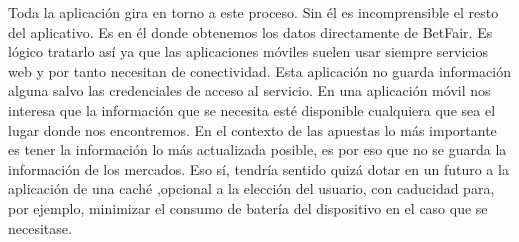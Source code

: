     
    Toda la aplicación gira en torno a este proceso. Sin él es incomprensible el resto del aplicativo. Es en él donde obtenemos los datos directamente de BetFair. Es lógico tratarlo así ya que las aplicaciones móviles suelen usar siempre servicios web y por tanto necesitan de conectividad. Esta aplicación no guarda información alguna salvo las credenciales de acceso al servicio. En una aplicación móvil nos interesa que la información que se necesita esté disponible cualquiera que sea el lugar donde nos encontremos. En el contexto de las apuestas lo más importante es tener la información lo más actualizada posible, es por eso que no se guarda la información de los mercados. Eso sí, tendría sentido quizá dotar en un futuro a la aplicación de una caché ,opcional a la elección del usuario, con caducidad para, por ejemplo, minimizar el consumo de batería del dispositivo en el caso que se necesitase.  
   
